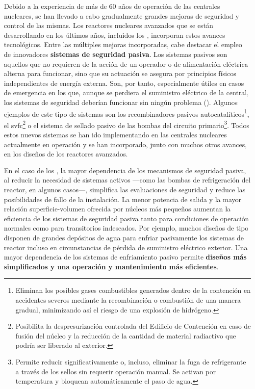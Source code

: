 Debido a la experiencia de más de 60 años de operación de las centrales nucleares, se han llevado a cabo gradualmente grandes mejoras de seguridad y control de las mismas. Los reactores nucleares avanzados que se están desarrollando en los últimos años, incluidos los , incorporan estos avances tecnológicos. Entre las múltiples mejoras incorporadas, cabe destacar el empleo de innovadores \textbf{sistemas de seguridad pasiva}. Los sistemas pasivos son aquellos que no requieren de la acción de un operador o de alimentación eléctrica alterna para funcionar, sino que su actuación se asegura por principios físicos independientes de energía externa. Son, por tanto, especialmente útiles en casos de emergencia en los que, aunque se perdiera el suministro eléctrico de la central, los sistemas de seguridad deberían funcionar sin ningún problema (\cite{glosario_seguridad_oiea}). Algunos ejemplos de este tipo de sistemas son los r\gls{ecombinadores pasivos} autocatalíticos\footnote{Eliminan los posibles gases combustibles generados dentro de la contención en accidentes severos mediante la recombinación o combustión de una manera gradual, minimizando así el riesgo de una explosión de hidrógeno.}, el \acrfull{svfc}\footnote{Posibilita la despresurización controlada del Edificio de Contención en caso de fusión del núcleo y la reducción de la cantidad de material radiactivo que podría ser liberado al exterior.} o el sistema de sellado pasivo de las bombas del circuito primario\footnote{Permite reducir significativamente o, incluso, eliminar la fuga de refrigerante a través de los sellos sin requerir operación manual. Se activan por temperatura y bloquean automáticamente
el paso de agua.}. Todos estos nuevos sistemas se han ido implementando en las centrales nucleares actualmente en operación y se han incorporado, junto con muchos otros avances, en los diseños de los reactores avanzados.

En el caso de los , la mayor dependencia de los mecanismos de seguridad pasiva, al reducir la necesidad de sistemas activos ---como las bombas de refrigeración del reactor, en algunos casos---, simplifica las evaluaciones de seguridad y reduce las posibilidades de fallo de la instalación. La menor potencia de salida y la mayor relación superficie-volumen ofrecida por núcleos más pequeños aumentan la eficiencia de los sistemas de seguridad pasiva tanto para condiciones de operación normales como para transitorios indeseados. Por ejemplo, muchos diseños de tipo  disponen de grandes depósitos de agua para enfriar pasivamente los sistemas de reactor incluso en circunstancias de pérdida de suministro eléctrico exterior. Una mayor dependencia de los sistemas de enfriamiento pasivo permite \textbf{diseños más simplificados y una operación y mantenimiento más eficientes}. 

